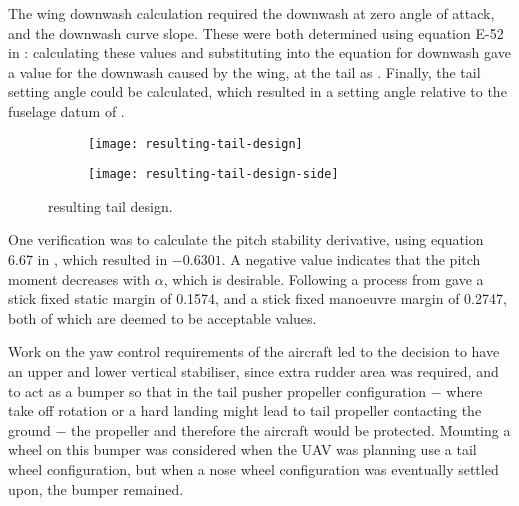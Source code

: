 \documentclass[../../main.tex]{subfiles}
\begin{document}
The wing downwash calculation required the downwash at zero angle of attack, and the downwash curve slope.
These were both determined using equation E-52 in \cite{torenbeek-76}: calculating these values and substituting into the equation for downwash gave a value for the downwash caused by the wing, at the tail as .
Finally, the tail setting angle could be calculated, which resulted in a setting angle relative to the fuselage datum of . 


\begin{figure}[H]

    \centering
    \begin{subfigure}[b]{0.49\columnwidth}
        \centering
        \texttt{[image: resulting-tail-design]}
        \caption{}
        \label{fig:final-tail-design:angle}
    \end{subfigure}
    \hfill
    \begin{subfigure}[b]{0.49\columnwidth}
        \centering
        \texttt{[image: resulting-tail-design-side]}
        \caption{}
        \label{fig:final-tail-design:side}
    \end{subfigure}
    
    \caption{resulting tail design.}
    \label{fig:final-tail-design}
\end{figure} 

One verification was to calculate the pitch stability derivative, using equation 6.67 in \cite{sadraey-13}, which resulted in $-0.6301$.
A negative value indicates that the pitch moment decreases with $\alpha$, which is desirable.
Following a process from \cite{de-kat-17} gave a stick fixed static margin of 0.1574, and a stick fixed manoeuvre margin of 0.2747, both of which are deemed to be acceptable values. 

Work on the yaw control requirements of the aircraft led to the decision to have an upper and lower vertical stabiliser, since extra rudder area was required, and to act as a bumper so that in the tail pusher propeller configuration $-$ where take off rotation or a hard landing might lead to tail propeller contacting the ground $-$ the propeller and therefore the aircraft would be protected.
Mounting a wheel on this bumper was considered when the UAV was planning use a tail wheel configuration, but when a nose wheel configuration was eventually settled upon, the bumper remained. 
\end{document}
